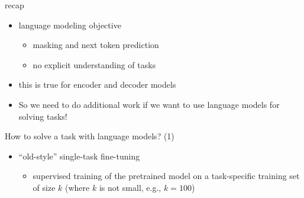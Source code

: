 \documentclass[11pt,compress,t,notes=noshow, xcolor=table]{beamer}
\begin{document}




\begin{frame}{recap}

\vfill

\begin{itemize}
    \item language modeling objective
        \begin{itemize}
            \item masking and next token prediction
            \item no explicit understanding of tasks
        \end{itemize}
    \item this is true for encoder and decoder models
    \item So we need to do additional work if we want
        to use language models for solving tasks!
\end{itemize}

\vfill

\end{frame}


\begin{frame}{How to solve a task with language models? (1)}

\vfill

\begin{itemize}
    \item ``old-style'' single-task fine-tuning 
        \begin{itemize}
            \item supervised training
of the pretrained model
on a task-specific
        training set of size $k$ (where $k$ is not small,
        e.g., $k=100$)
        \end{itemize}
\end{itemize}

\vfill

\end{frame}
\end{document}

